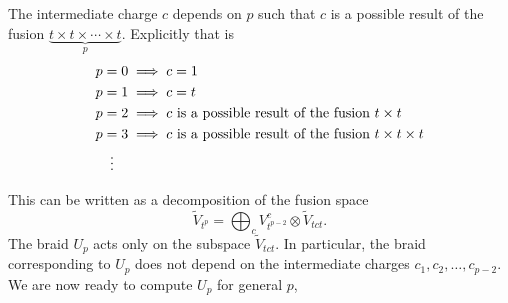 \documentclass[a4paper,10pt,oneside]{book}
\theoremstyle{plain}
\theoremstyle{definition}
\theoremstyle{remark}
\begin{document}
The intermediate charge $c$ depends on $p$ such that $c$ is a possible result of the fusion $\underbrace{t \times t \times \cdots \times t}_{p}$. Explicitly that is
\begin{align*}
  p &= 0 \implies c = 1 \\
  p &= 1 \implies c = t \\
  p &= 2 \implies c \text{ is a possible result of the fusion } t \times t \\
  p &= 3 \implies c \text{ is a possible result of the fusion } t \times t \times t \\
  & \vdotswithin{=}
\end{align*}

This can be written as a decomposition of the fusion space
\begin{equation}
  \widetilde{V}_{t^p} = \bigoplus_c V_{t^{p-2}}^c ⊗ \widetilde{V}_{tct}.
\end{equation}
The braid $U_p$ acts only on the subspace $\widetilde{V}_{tct}$. In particular, the braid corresponding to $U_p$ does not depend on the intermediate charges $c_1, c_2, \ldots, c_{p-2}$. We are now ready to compute $U_p$ for general $p$,
\end{document}
